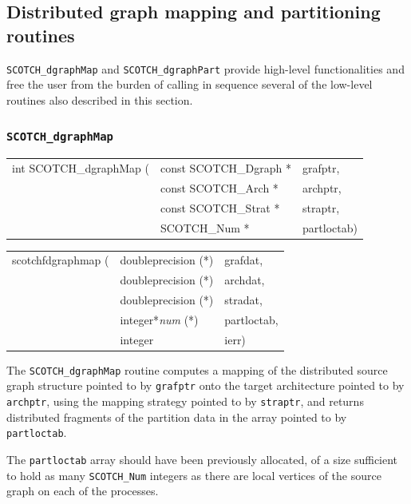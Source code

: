 \subsection{Distributed graph mapping and partitioning routines}

{\tt SCOTCH\_dgraphMap} and {\tt SCOTCH\_dgraphPart} provide
high-level functionalities and free the user from the burden of
calling in sequence several of the low-level routines also described
in this section.

\subsubsection{{\tt SCOTCH\_dgraphMap}}

\begin{itemize}
\progsyn

{\tt\begin{tabular}{l@{}ll}
int SCOTCH\_dgraphMap ( & const SCOTCH\_Dgraph * & grafptr, \\
                        & const SCOTCH\_Arch *   & archptr, \\
                        & const SCOTCH\_Strat *  & straptr, \\
                        & SCOTCH\_Num *          & partloctab)
\end{tabular}}

{\tt\begin{tabular}{l@{}ll}
scotchfdgraphmap ( & doubleprecision (*)   & grafdat,    \\
                   & doubleprecision (*)   & archdat,    \\
                   & doubleprecision (*)   & stradat,    \\
                   & integer*{\it num} (*) & partloctab, \\
                   & integer               & ierr)
\end{tabular}}

\progdes

The {\tt SCOTCH\_dgraphMap} routine computes a mapping of the
distributed source graph structure pointed to by {\tt grafptr} onto
the target architecture pointed to by {\tt archptr}, using the mapping
strategy pointed to by {\tt straptr}, and returns distributed
fragments of the partition data in the array pointed to by {\tt
partloctab}.

The {\tt partloctab} array should have been previously allocated, of a
size sufficient to hold as many {\tt SCOTCH\_\lbt Num} integers as
there are local vertices of the source graph on each of the processes.


\end{itemize}
